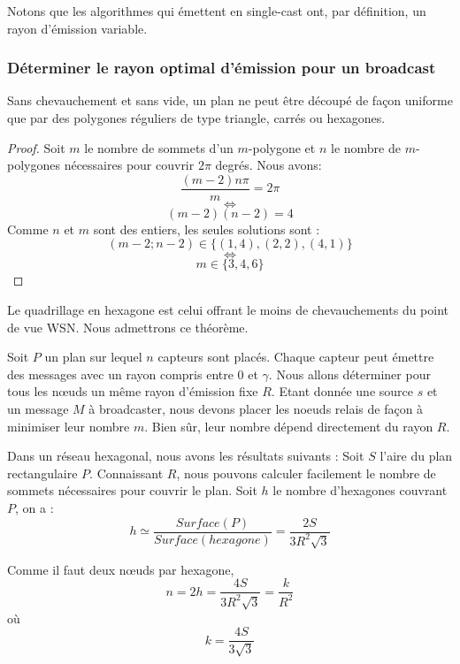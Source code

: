 Notons que les algorithmes qui émettent en single-cast ont, par définition, un rayon d'émission variable.

\subsubsection{Déterminer le rayon optimal d'émission pour un broadcast}
\begin{myth}
Sans chevauchement et sans vide, un plan ne peut être découpé de façon uniforme que par des polygones réguliers de type triangle, carrés ou hexagones.
\end{myth}
\begin{proof}
Soit $m$ le nombre de sommets d'un $m$-polygone et $n$ le nombre de $m$-polygones nécessaires pour couvrir $2\pi$ degrés. Nous avons: 
$$\frac{(m-2)n\pi}{m}=2\pi$$
$$\Leftrightarrow$$
$$(m-2)(n-2)=4$$
Comme $n$ et $m$ sont des entiers, les seules solutions sont : 
$$(m-2;n-2)\in\{(1,4),(2,2),(4,1) \}$$
$$\Leftrightarrow$$
$$m \in \{ 3,4,6 \}$$
\end{proof}

\begin{myth}
Le quadrillage en hexagone est celui offrant le moins de chevauchements du point de vue WSN. Nous admettrons ce théorème.
\end{myth}

Soit $P$ un plan sur lequel $n$ capteurs sont placés. Chaque capteur peut émettre des messages avec un rayon compris entre 0 et $\gamma$. Nous allons déterminer pour tous les nœuds un même rayon d'émission fixe $R$.
Etant donnée une source $s$ et un message $M$ à broadcaster, nous devons placer les noeuds relais de façon à minimiser leur nombre $m$. Bien sûr, leur nombre dépend directement du rayon $R$.
 

Dans un réseau hexagonal, nous avons les résultats suivants :
Soit $S$ l'aire du plan rectangulaire $P$. Connaissant $R$, nous pouvons calculer facilement le nombre de sommets nécessaires pour couvrir le plan.
Soit $h$ le nombre d'hexagones couvrant $P$, on a : 
$$h \simeq \frac{Surface ( P)}{Surface(hexagone)}=\frac{2S}{3R^2 \sqrt{3}}$$

Comme il faut deux nœuds par hexagone,
$$n=2h=\frac{4S}{3R^2 \sqrt{3}}= \frac{k}{R^2}$$ où $$k=\frac{4S}{3 \sqrt{3}}$$

